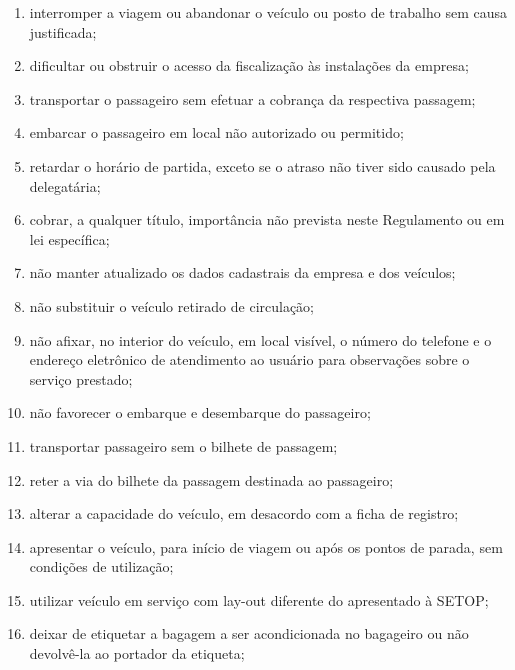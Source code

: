 \begin{enumerate}[resume, label=Art. \arabic*]
\begin{enumerate}[label=\roman*.]
\item interromper a viagem ou abandonar o veículo ou posto de trabalho sem causa justificada;

\item dificultar ou obstruir o acesso da fiscalização às instalações da empresa;

\item transportar o passageiro sem efetuar a cobrança da respectiva passagem;

\item embarcar o passageiro em local não autorizado ou permitido;

\item retardar o horário de partida, exceto se o atraso não tiver sido causado pela delegatária;

\item cobrar, a qualquer título, importância não prevista neste Regulamento ou em lei específica;

\item não manter atualizado os dados cadastrais da empresa e dos veículos;

\item não substituir o veículo retirado de circulação;

\item não afixar, no interior do veículo, em local visível, o número do telefone e o endereço eletrônico de atendimento ao usuário para observações sobre o serviço prestado;

\item não favorecer o embarque e desembarque do passageiro;

\item transportar passageiro sem o bilhete de passagem;

\item reter a via do bilhete da passagem destinada ao passageiro;

\item alterar a capacidade do veículo, em desacordo com a ficha de registro;

\item apresentar o veículo, para início de viagem ou após os pontos de parada, sem condições de utilização;

\item utilizar veículo em serviço com lay-out diferente do apresentado à SETOP;

\item deixar de etiquetar a bagagem a ser acondicionada no bagageiro ou não devolvê-la ao portador da etiqueta;


\end{enumerate}
\end{enumerate}
